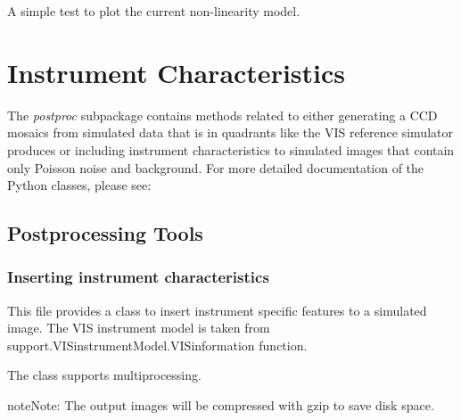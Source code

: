 \documentclass[a4paper,12pt,english]{sphinxmanual}
\begin{document}

\begin{fulllineitems}
\label{instrument:support.VISinstrumentModel.testNonLinearity}
A simple test to plot the current non-linearity model.

\end{fulllineitems}



\section{Instrument Characteristics}
\label{index:instrument-characteristics}
The \emph{postproc} subpackage contains methods related to either generating a CCD mosaics from simulated data
that is in quadrants like the VIS reference simulator produces or including instrument characteristics
to simulated images that contain only Poisson noise and background. For more detailed documentation
of the Python classes, please see:


\subsection{Postprocessing Tools}
\label{postproc:postprocessing-tools}\label{postproc::doc}\label{postproc:module-postproc.postprocessing}

\subsubsection{Inserting instrument characteristics}
\label{postproc:inserting-instrument-characteristics}
This file provides a class to insert instrument specific features to a simulated image. The VIS instrument
model is taken from support.VISinstrumentModel.VISinformation function.

The class supports multiprocessing.

\begin{notice}{note}{Note:}
The output images will be compressed with gzip to save disk space.
\end{notice}
\end{document}
